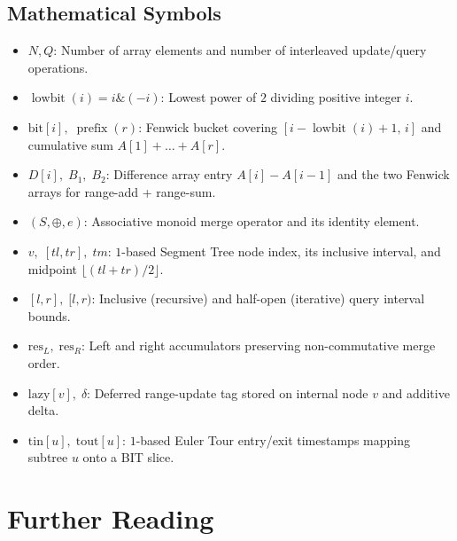 \documentclass[11pt,a4paper]{article}
\theoremstyle{definition}
\begin{document}
\subsection*{Mathematical Symbols}
\begin{itemize}[itemsep=3pt]
    \item $N, Q$: Number of array elements and number of interleaved update/query operations.
    \item $\operatorname{lowbit}(i) = i \mathbin{\&} (-i)$: Lowest power of $2$ dividing positive integer $i$.
    \item $\text{bit}[i],\; \operatorname{prefix}(r)$: Fenwick bucket covering $[i - \operatorname{lowbit}(i) + 1,\, i]$ and cumulative sum $A[1] + \dots + A[r]$.
    \item $D[i],\; B_1,\; B_2$: Difference array entry $A[i] - A[i-1]$ and the two Fenwick arrays for range-add + range-sum.
    \item $(S, \oplus, e)$: Associative monoid merge operator and its identity element.
    \item $v,\; [tl, tr],\; tm$: $1$-based Segment Tree node index, its inclusive interval, and midpoint $\lfloor (tl + tr)/2 \rfloor$.
    \item $[l, r],\; [l, r)$: Inclusive (recursive) and half-open (iterative) query interval bounds.
    \item $\text{res}_L,\; \text{res}_R$: Left and right accumulators preserving non-commutative merge order.
    \item $\text{lazy}[v],\; \delta$: Deferred range-update tag stored on internal node $v$ and additive delta.
    \item $\text{tin}[u],\; \text{tout}[u]$: $1$-based Euler Tour entry/exit timestamps mapping subtree $u$ onto a BIT slice.
\end{itemize}

\section{Further Reading}
\end{document}
